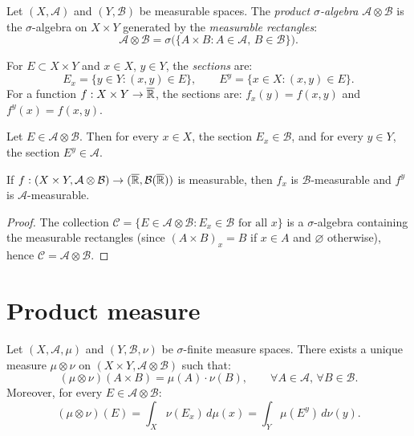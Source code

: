 \begin{definition}
Let $(X, \mathcal{A})$ and $(Y, \mathcal{B})$ be measurable spaces. The
\emph{product $\sigma$-algebra}
$\mathcal{A} \otimes \mathcal{B}$ is the $\sigma$-algebra on $X \times Y$
generated by the \emph{measurable rectangles}:
\[
    \mathcal{A} \otimes \mathcal{B}
    = \sigma\bigl(\{A \times B : A \in \mathcal{A},\, B \in \mathcal{B}\}\bigr).
\]
\end{definition}

\begin{definition}[Sections]
For $E \subset X \times Y$ and $x \in X$, $y \in Y$, the \emph{sections}
are:
\[
    E_x = \{y \in Y : (x,y) \in E\}, \qquad
    E^y = \{x \in X : (x,y) \in E\}.
\]
For a function $f : X \times Y \to \overline{\mathbb{R}}$, the sections are:
$f_x(y) = f(x,y)$ and $f^y(x) = f(x,y)$.
\end{definition}

\begin{proposition}
\label{prop:sections_measurable}
Let $E \in \mathcal{A} \otimes \mathcal{B}$. Then for every $x \in X$, the section
$E_x \in \mathcal{B}$, and for every $y \in Y$, the section $E^y \in \mathcal{A}$.

If $f : (X \times Y, \mathcal{A} \otimes \mathcal{B}) \to
(\overline{\mathbb{R}}, \mathcal{B}(\overline{\mathbb{R}}))$ is measurable, then $f_x$ is
$\mathcal{B}$-measurable and $f^y$ is $\mathcal{A}$-measurable.
\end{proposition}

\begin{proof}
The collection $\mathcal{C} = \{E \in \mathcal{A} \otimes \mathcal{B} :
E_x \in \mathcal{B} \text{ for all } x\}$ is a $\sigma$-algebra containing the
measurable rectangles (since $(A \times B)_x = B$ if $x \in A$ and $\varnothing$
otherwise), hence $\mathcal{C} = \mathcal{A} \otimes \mathcal{B}$.
\end{proof}

\section{Product measure}

\begin{theorem}
\label{thm:product_measure}
Let $(X, \mathcal{A}, \mu)$ and $(Y, \mathcal{B}, \nu)$ be $\sigma$-finite measure
spaces. There exists a unique measure $\mu \otimes \nu$ on
$(X \times Y, \mathcal{A} \otimes \mathcal{B})$ such that:
\[
    (\mu \otimes \nu)(A \times B) = \mu(A) \cdot \nu(B),
    \qquad \forall A \in \mathcal{A},\, \forall B \in \mathcal{B}.
\]
Moreover, for every $E \in \mathcal{A} \otimes \mathcal{B}$:
\[
    (\mu \otimes \nu)(E) = \int_X \nu(E_x)\, d\mu(x)
    = \int_Y \mu(E^y)\, d\nu(y).
\]
\end{theorem}

